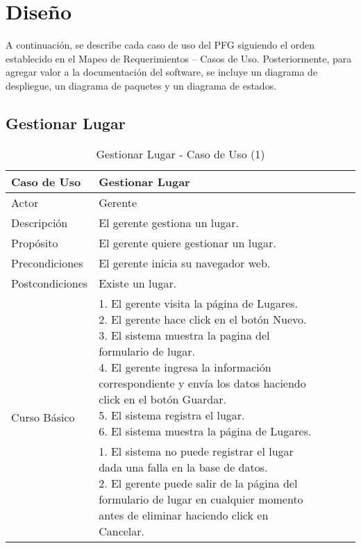

\chapter{Diseño}
A continuación, se describe cada caso de uso del PFG siguiendo el orden establecido en el Mapeo de Requerimientos – Casos de Uso. Posteriormente, para agregar valor a la documentación del software, se incluye un diagrama de despliegue, un diagrama de paquetes y un diagrama de estados.  
\section{Gestionar Lugar}

\begin{table}[H]
    \begin{tabular}{@{} *5l @{}} \toprule
    \textbf{Caso de Uso} & Gestionar Lugar \\ \midrule
    Actor & Gerente \\ 
    Descripción & El gerente gestiona un lugar. \\ 
    Propósito & El gerente quiere gestionar un lugar. \\ \midrule
    Precondiciones & El gerente inicia su navegador web. \\ \midrule
    Postcondiciones & Existe un lugar. \\ \midrule
    \multirow{4}{*}{Curso Básico}
        & \parbox{0.75\linewidth}{ 
                1. El gerente visita la página de Lugares. \\
                2. El gerente hace click en el botón Nuevo. \\
                3. El sistema muestra la pagina del formulario de lugar. \\
                4. El gerente ingresa la información correspondiente y envía los datos haciendo click en el botón Guardar. \\
                5. El sistema registra el lugar.  \\
                6. El sistema muestra la página de Lugares.   
        } \\ \midrule
        & \parbox{0.75\linewidth}{ 
            1. El sistema no puede registrar el lugar dada una falla en la base de datos. \\
            2. El gerente puede salir de la página del formulario de lugar en cualquier momento antes de eliminar haciendo click en Cancelar.
        }  \\  \bottomrule
     \hline
    \end{tabular}
        \caption{Gestionar Lugar - Caso de Uso (1)}
        \label{tab:tabcu-lugar}
\end{table}


